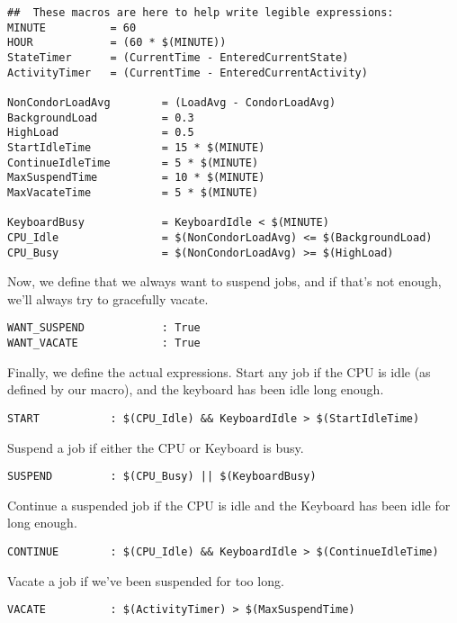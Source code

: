\begin{verbatim}
##  These macros are here to help write legible expressions:
MINUTE          = 60
HOUR            = (60 * $(MINUTE))
StateTimer      = (CurrentTime - EnteredCurrentState)
ActivityTimer   = (CurrentTime - EnteredCurrentActivity)

NonCondorLoadAvg        = (LoadAvg - CondorLoadAvg)
BackgroundLoad          = 0.3
HighLoad                = 0.5
StartIdleTime           = 15 * $(MINUTE)
ContinueIdleTime        = 5 * $(MINUTE)
MaxSuspendTime          = 10 * $(MINUTE)
MaxVacateTime           = 5 * $(MINUTE)

KeyboardBusy            = KeyboardIdle < $(MINUTE)
CPU_Idle                = $(NonCondorLoadAvg) <= $(BackgroundLoad)
CPU_Busy                = $(NonCondorLoadAvg) >= $(HighLoad)
\end{verbatim}

Now, we define that we always want to suspend jobs, and if that's not
enough, we'll always try to gracefully vacate. 

\begin{verbatim}
WANT_SUSPEND            : True
WANT_VACATE             : True
\end{verbatim}

Finally, we define the actual expressions.  Start any job if the CPU
is idle (as defined by our macro), and the keyboard has been idle long
enough.

\begin{verbatim}
START           : $(CPU_Idle) && KeyboardIdle > $(StartIdleTime)
\end{verbatim}

Suspend a job if either the CPU or Keyboard is busy.

\begin{verbatim}
SUSPEND         : $(CPU_Busy) || $(KeyboardBusy)
\end{verbatim}

Continue a suspended job if the CPU is idle and the Keyboard has been
idle for long enough.

\begin{verbatim}
CONTINUE        : $(CPU_Idle) && KeyboardIdle > $(ContinueIdleTime)
\end{verbatim}

Vacate a job if we've been suspended for too long.

\begin{verbatim}
VACATE          : $(ActivityTimer) > $(MaxSuspendTime)
\end{verbatim}

